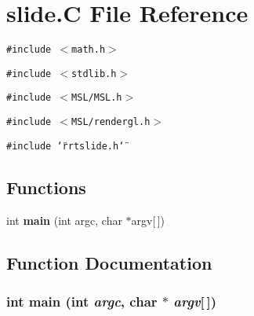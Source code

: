 \section{slide.C File Reference}
\label{slide_C}
{\tt \#include $<$math.h$>$}\par
{\tt \#include $<$stdlib.h$>$}\par
{\tt \#include $<$MSL/MSL.h$>$}\par
{\tt \#include $<$MSL/rendergl.h$>$}\par
{\tt \#include \char`\"{}rrtslide.h\char`\"{}}\par
\subsection*{Functions}
\begin{CompactItemize}
\item 
int {\bf main} (int argc, char $\ast$argv[$\,$])
\end{CompactItemize}


\subsection{Function Documentation}
\subsubsection{\setlength{\rightskip}{0pt plus 5cm}int main (int {\em argc}, char $\ast$ {\em argv}[$\,$])}\label{slide_C_a0}


